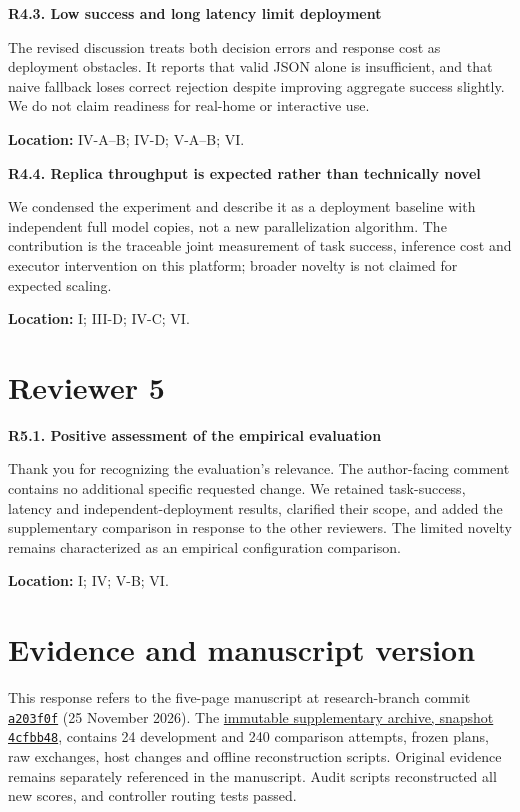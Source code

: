 \documentclass[11pt,a4paper]{article}
\newcommand{\point}[2]{\vspace{4pt}\textbf{#1. #2}\par}
\newcommand{\where}[1]{\par{\small\textcolor{ink}{\textbf{Location:} #1}}\par}
\begin{document}
\point{R4.3}{Low success and long latency limit deployment}
The revised discussion treats both decision errors and response cost as deployment obstacles. It reports that valid JSON alone is insufficient, and that naive fallback loses correct rejection despite improving aggregate success slightly. We do not claim readiness for real-home or interactive use.
\where{IV-A--B; IV-D; V-A--B; VI.}

\point{R4.4}{Replica throughput is expected rather than technically novel}
We condensed the experiment and describe it as a deployment baseline with independent full model copies, not a new parallelization algorithm. The contribution is the traceable joint measurement of task success, inference cost and executor intervention on this platform; broader novelty is not claimed for expected scaling.
\where{I; III-D; IV-C; VI.}

\section*{Reviewer 5}
\point{R5.1}{Positive assessment of the empirical evaluation}
Thank you for recognizing the evaluation's relevance. The author-facing comment contains no additional specific requested change. We retained task-success, latency and independent-deployment results, clarified their scope, and added the supplementary comparison in response to the other reviewers. The limited novelty remains characterized as an empirical configuration comparison.
\where{I; IV; V-B; VI.}

\section*{Evidence and manuscript version}
This response refers to the five-page manuscript at research-branch commit
\href{https://github.com/hudsonmoreira-spec/labrador-distributed-llm-benchmarks/commit/a203f0ffd32aff1ee3b5abd4cc26181837948ae4}{\texttt{a203f0f}} (25 November 2026).
The \href{https://github.com/hudsonmoreira-spec/labrador-distributed-llm-benchmarks/tree/4cfbb483ddb5b53201c73c7f48f73cee03a85615/experiments/smarthome_agents/hybrid_comparison_20261125}{immutable supplementary archive, snapshot \texttt{4cfbb48}}, contains 24 development and 240 comparison attempts, frozen plans, raw exchanges, host changes and offline reconstruction scripts. Original evidence remains separately referenced in the manuscript. Audit scripts reconstructed all new scores, and controller routing tests passed.
\end{document}
